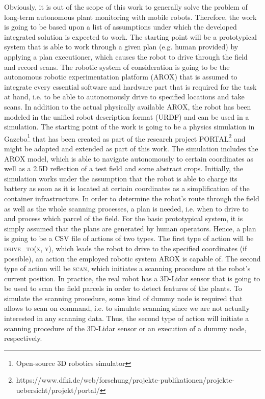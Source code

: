 \documentclass[english, master, expose, utf8]{base/thesis_KBS}
\begin{document}
Obviously, it is out of the scope of this work to generally solve the problem of long-term autonomous plant monitoring with mobile robots.
Therefore, the work is going to be based upon a list of assumptions under which the developed integrated solution is expected to work.
The starting point will be a prototypical system that is able to work through a given plan (e.g. human provided) by applying a plan executioner,
which causes the robot to drive through the field and record scans.
The robotic system of consideration is going to be the autonomous robotic experimentation platform (AROX) \cite{Kisliuk:2021} that is assumed to integrate every
essential software and hardware part that is required for the task at hand, i.e. to be able to autonomously drive to specified locations and take scans.
In addition to the actual physically available AROX, the robot has been modeled in the unified robot description format (URDF) and can be used in a simulation.
The starting point of the work is going to be a physics simulation in Gazebo\footnote{Open-source 3D robotics simulator} that has been created as part of the research project 
PORTAL\footnote{https://www.dfki.de/web/forschung/projekte-publikationen/projekte-uebersicht/projekt/portal/} and might be adapted and extended as part of this work.
The simulation includes the AROX model, which is able to navigate autonomously to certain coordinates as well as a 2.5D  reflection of a test field and some abstract crops.
Initially, the simulation works under the assumption that the robot is able to charge its battery as soon as it is located at certain coordinates as a simplification
of the container infrastructure.\newline
In order to determine the robot's route through the field as well as the whole scanning processes, a plan is needed, i.e. when to drive to and process which parcel of the field. 
For the basic prototypical system, it is simply assumed that the plans are generated by human operators. Hence, a plan is going to be a CSV file of actions of two types.
The first type of action will be \textsc{drive\_to(x, y)}, which leads the robot to drive to the specified coordinates (if possible), an action the employed robotic system 
AROX is capable of. The second type of action will be \textsc{scan}, which initiates a scanning procedure at the robot's current position. 
In practice, the real robot has a 3D-Lidar sensor that is going to be used to scan the field parcels in order to detect features of the plants. To simulate the scanning 
procedure, some kind of dummy node is required that allows to scan on command, i.e. to simulate scanning since we are not actually interested in any scanning data.
Thus, the second type of action will initiate a scanning procedure of the 3D-Lidar sensor or an execution of a dummy node, respectively.
\end{document}
